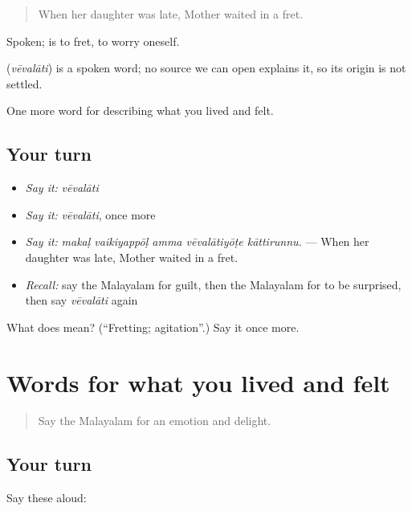 \begin{quote}
When her daughter was late, Mother waited in a fret.
\end{quote}

Spoken;  is to fret, to worry oneself.

\begin{cousinweb}
\textbf{} (\emph{vēvalāti}) is a spoken word; no source we can open explains it, so its origin is not settled.
\end{cousinweb}

\begin{grammarlens}[title={What you've built}]
One more word for describing what you lived and felt.
\end{grammarlens}

\subsection*{Your turn}
\begin{itemize}
\raggedright
  \item \emph{Say it:} \emph{vēvalāti}
  \item \emph{Say it:} \emph{vēvalāti}, once more
  \item \emph{Say it:} \emph{makaḷ vaikiyappōḷ amma vēvalātiyōṭe kāttirunnu.} — When her daughter was late, Mother waited in a fret.
  \item \emph{Recall:} say the Malayalam for guilt, then the Malayalam for to be surprised, then say \emph{vēvalāti} again
\end{itemize}

\begin{tcolorbox}[breakable,colback=teal!4,colframe=teal!35!black,title={Before you move on}]
What does  mean? (\textquotedblleft{}Fretting; agitation\textquotedblright{}.) Say it once more.
\end{tcolorbox}
\section[(dialogue)]{Words for what you lived and felt}

\label{lesson:ML-R524-review-517-524}



\begin{quote}
Say the Malayalam for an emotion and delight.
\end{quote}

\subsection*{Your turn}
Say these aloud:


